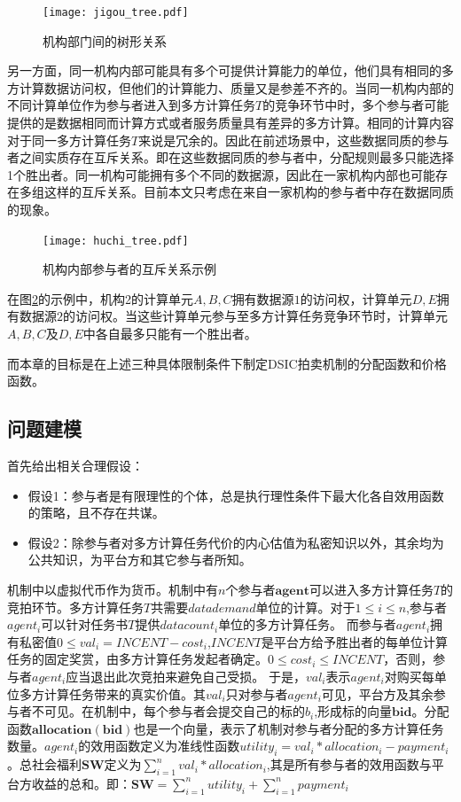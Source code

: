\documentclass[promaster]{thesis-uestc}
\begin{document}
\begin{figure}[h]
\center
    \texttt{[image: jigou\_tree.pdf]}
    \caption{机构部门间的树形关系}
    \label{jigoushu}
\end{figure}

另一方面，同一机构内部可能具有多个可提供计算能力的单位，他们具有相同的多方计算数据访问权，但他们的计算能力、质量又是参差不齐的。当同一机构内部的不同计算单位作为参与者进入到多方计算任务$T$的竞争环节中时，多个参与者可能提供的是数据相同而计算方式或者服务质量具有差异的多方计算。相同的计算内容对于同一多方计算任务$T$来说是冗余的。因此在前述场景中，这些数据同质的参与者之间实质存在互斥关系。即在这些数据同质的参与者中，分配规则最多只能选择1个胜出者。同一机构可能拥有多个不同的数据源，因此在一家机构内部也可能存在多组这样的互斥关系。目前本文只考虑在来自一家机构的参与者中存在数据同质的现象。

\begin{figure}[h]
    \texttt{[image: huchi\_tree.pdf]}
    \caption{机构内部参与者的互斥关系示例}
    \label{huchishu}
\end{figure}

在图\ref{huchishu}的示例中，机构2的计算单元$A,B,C$拥有数据源$1$的访问权，计算单元$D,E$拥有数据源$2$的访问权。当这些计算单元参与至多方计算任务竞争环节时，计算单元$A,B,C$及$D,E$中各自最多只能有一个胜出者。

而本章的目标是在上述三种具体限制条件下制定DSIC拍卖机制的分配函数和价格函数。

\FloatBarrier

\subsection{问题建模}
\label{xingshihua}

首先给出相关合理假设：

\begin{itemize}
    \item 假设1：参与者是有限理性的个体，总是执行理性条件下最大化各自效用函数的策略，且不存在共谋。
    \item 假设2：除参与者对多方计算任务代价的内心估值为私密知识以外，其余均为公共知识，为平台方和其它参与者所知。
\end{itemize}

机制中以虚拟代币作为货币。机制中有$n$个参与者$\mathbf{agent}$可以进入多方计算任务$T$的竞拍环节。多方计算任务$T$共需要$datademand$单位的计算。对于$1\leq i\leq n$,参与者$agent_i$可以针对任务书$T$提供$datacount_i$单位的多方计算任务。
而参与者$agent_i$拥有私密值$0 \leq val_i = INCENT-cost_i$,$INCENT$是平台方给予胜出者的每单位计算任务的固定奖赏，由多方计算任务发起者确定。$0 \leq cost_i \leq INCENT$，否则，参与者$agent_i$应当退出此次竞拍来避免自己受损。 于是，$val_i$表示$agent_i$对购买每单位多方计算任务带来的真实价值。其$val_i$只对参与者$agent_i$可见，平台方及其余参与者不可见。在机制中，每个参与者会提交自己的标的$b_i$,形成标的向量$\mathbf{bid}$。分配函数$\mathbf{allocation}(\mathbf{bid})$也是一个向量，表示了机制对参与者分配的多方计算任务数量。$agent_i$的效用函数定义为准线性函数$utility_i = val_i*allocation_i-payment_i$。总社会福利$\mathbf{SW}$定义为$\sum_{i=1}^n{val_i*allocation_i}$,其是所有参与者的效用函数与平台方收益的总和。即：$\mathbf{SW} = \sum_{i=1}^n{utility_i}+\sum_{i=1}^{n}{payment_i}$
\end{document}
